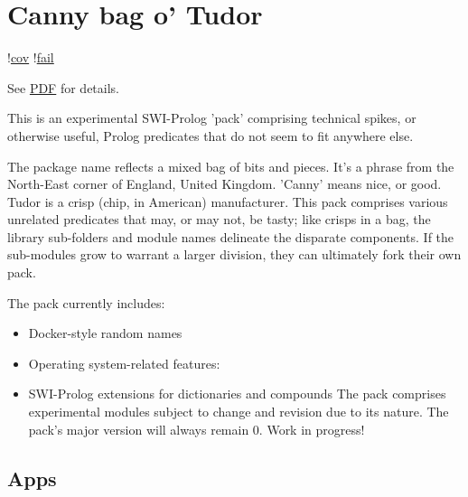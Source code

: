 
\chapter{Canny bag o' Tudor}

!\href{https://shields.io/endpoint?url=https://gist.githubusercontent.com/royratcliffe/ec92ac84832950815861d35c2f661953/raw/cov.json}{cov}
!\href{https://shields.io/endpoint?url=https://gist.githubusercontent.com/royratcliffe/ec92ac84832950815861d35c2f661953/raw/fail.json}{fail}

See \href{https://github.com/royratcliffe/canny_tudor/blob/main/man/canny_tudor.pdf}{PDF} for details.

This is an experimental SWI-Prolog 'pack' comprising technical spikes, or
otherwise useful, Prolog predicates that do not seem to fit anywhere else.

The package name reflects a mixed bag of bits and pieces. It's a phrase from the
North-East corner of England, United Kingdom. 'Canny' means nice, or good. Tudor
is a crisp (chip, in American) manufacturer. This pack comprises various
unrelated predicates that may, or may not, be tasty; like crisps in a bag, the
library sub-folders and module names delineate the disparate components. If the
sub-modules grow to warrant a larger division, they can ultimately fork their
own pack.

The pack currently includes:

\begin{itemize}
    \item Docker-style random names
    \item Operating system-related features:


    \item SWI-Prolog extensions for dictionaries and compounds
The pack comprises experimental modules subject to change and revision
due to its nature. The pack's major version will always remain 0.
Work in progress!
\end{itemize}

\section{Apps}

